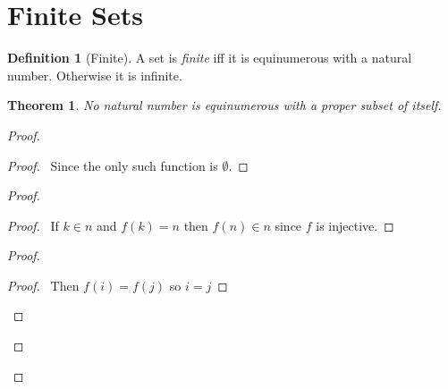 \documentclass{article}
\newtheorem{theorem}[axiom]{Theorem}
\theoremstyle{definition}
\newtheorem{definition}[axiom]{Definition}
\begin{document}
    \section{Finite Sets}

    \begin{definition}[Finite]
        A set is \emph{finite} iff it is equinumerous with a natural number. Otherwise it is infinite.
    \end{definition}

    \begin{theorem}
        No natural number is equinumerous with a proper subset of itself.
    \end{theorem}

    \begin{proof}
        \pf
        \begin{proof}
            \pf\ Since the only such function is $\emptyset$.
        \end{proof}
        \begin{proof}
            \begin{proof}
                \pf\ If $k \in n$ and $f(k) = n$ then $f(n) \in n$ since $f$ is injective.
            \end{proof}
            \begin{proof}
                \begin{proof}
                    \pf\ Then $f(i) = f(j)$ so $i = j$
                \end{proof}

\end{proof}
\end{proof}
\end{proof}
\end{document}
